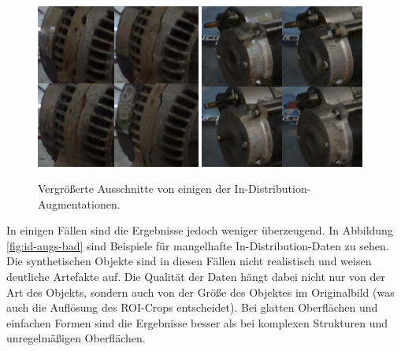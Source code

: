\begin{figure}
	\centering
	\includegraphics[width=0.48\textwidth]{figure_results_id-augs_good_1.png}%
	\hspace{0.02\textwidth}\includegraphics[width=0.48\textwidth]{figure_results_id-augs_good_2.png}
	\caption{Vergrößerte Ausschnitte von einigen der In-Distribution-Augmentationen.}
	\label{fig:id-augs-good}
\end{figure}

In einigen Fällen sind die Ergebnisse jedoch weniger überzeugend. In Abbildung \ref{fig:id-augs-bad} sind Beispiele für mangelhafte In-Distribution-Daten zu sehen. Die synthetischen Objekte sind in diesen Fällen nicht realistisch und weisen deutliche Artefakte auf. Die Qualität der Daten hängt dabei nicht nur von der Art des Objekts, sondern auch von der Größe des Objektes im Originalbild (was auch die Auflösung des ROI-Crops entscheidet). Bei glatten Oberflächen und einfachen Formen sind die Ergebnisse besser als bei komplexen Strukturen und unregelmäßigen Oberflächen.

